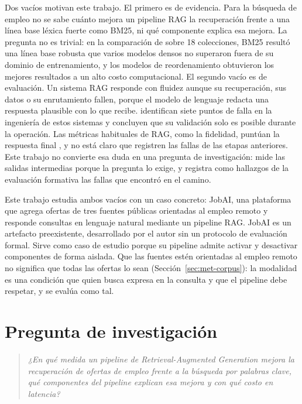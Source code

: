 Dos vacíos motivan este trabajo. El primero es de evidencia. Para la búsqueda de empleo no se sabe cuánto mejora un pipeline RAG la recuperación frente a una línea base léxica fuerte como BM25, ni qué componente explica esa mejora. La pregunta no es trivial: en la comparación de \citet{Thakur2021} sobre 18 colecciones, BM25 resultó una línea base robusta que varios modelos densos no superaron fuera de su dominio de entrenamiento, y los modelos de reordenamiento obtuvieron los mejores resultados a un alto costo computacional. El segundo vacío es de evaluación. Un sistema RAG responde con fluidez aunque su recuperación, sus datos o su enrutamiento fallen, porque el modelo de lenguaje redacta una respuesta plausible con lo que recibe. \citet{Barnett2024} identifican siete puntos de falla en la ingeniería de estos sistemas y concluyen que su validación solo es posible durante la operación. Las métricas habituales de RAG, como la fidelidad, puntúan la respuesta final \citep{Es2024}, y no está claro que registren las fallas de las etapas anteriores. Este trabajo no convierte esa duda en una pregunta de investigación: mide las salidas intermedias porque la pregunta lo exige, y registra como hallazgos de la evaluación formativa las fallas que encontró en el camino.

Este trabajo estudia ambos vacíos con un caso concreto: JobAI, una plataforma que agrega ofertas de tres fuentes públicas orientadas al empleo remoto y responde consultas en lenguaje natural mediante un pipeline RAG. JobAI es un artefacto preexistente, desarrollado por el autor sin un protocolo de evaluación formal. Sirve como caso de estudio porque su pipeline admite activar y desactivar componentes de forma aislada. Que las fuentes estén orientadas al empleo remoto no significa que todas las ofertas lo sean (Sección~\ref{sec:met-corpus}): la modalidad es una condición que quien busca expresa en la consulta y que el pipeline debe respetar, y se evalúa como tal.

\section{Pregunta de investigación}

\begin{quote}
\textit{¿En qué medida un pipeline de Retrieval-Augmented Generation mejora la recuperación de ofertas de empleo frente a la búsqueda por palabras clave, qué componentes del pipeline explican esa mejora y con qué costo en latencia?}
\end{quote}

